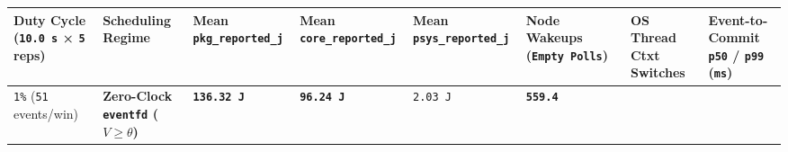 \documentclass[10pt,letterpaper]{article}
\begin{document}
{\scriptsize\setlength{\tabcolsep}{2.4pt}\renewcommand{\arraystretch}{1.12}
\begin{longtable}[]{@{}
  >{\raggedright\arraybackslash}p{}
  >{\raggedright\arraybackslash}p{}
  >{\raggedleft\arraybackslash}p{}
  >{\raggedleft\arraybackslash}p{}
  >{\raggedleft\arraybackslash}p{}
  >{\raggedleft\arraybackslash}p{}
  >{\raggedleft\arraybackslash}p{}
  >{\raggedleft\arraybackslash}p{}@{}}
\toprule\noalign{}
\begin{minipage}[b]{\linewidth}\raggedright
\textbf{Duty Cycle (\texttt{10.0\ s} × \texttt{5} reps)}
\end{minipage} & \begin{minipage}[b]{\linewidth}\raggedright
\textbf{Scheduling Regime}
\end{minipage} & \begin{minipage}[b]{\linewidth}\raggedleft
\textbf{Mean \texttt{pkg\_\allowbreak{}reported\_\allowbreak{}j}}
\end{minipage} & \begin{minipage}[b]{\linewidth}\raggedleft
\textbf{Mean \texttt{core\_\allowbreak{}reported\_\allowbreak{}j}}
\end{minipage} & \begin{minipage}[b]{\linewidth}\raggedleft
\textbf{Mean \texttt{psys\_\allowbreak{}reported\_\allowbreak{}j}}
\end{minipage} & \begin{minipage}[b]{\linewidth}\raggedleft
\textbf{Node Wakeups (\texttt{Empty\ Polls})}
\end{minipage} & \begin{minipage}[b]{\linewidth}\raggedleft
\textbf{OS Thread Ctxt Switches}
\end{minipage} & \begin{minipage}[b]{\linewidth}\raggedleft
\textbf{Event-to-Commit \texttt{p50} / \texttt{p99} (\texttt{ms})}
\end{minipage} \\
\midrule\noalign{}
\endhead
\bottomrule\noalign{}
\endlastfoot
\texttt{1\%} (\texttt{51} events/win) & \textbf{Zero-Clock
\texttt{eventfd} (\(V \ge \theta\))} & \textbf{\texttt{136.32\ J}} &
\textbf{\texttt{96.24\ J}} & \texttt{2.03\ J} & \textbf{\texttt{559.4}
}
\end{longtable}}
\end{document}
